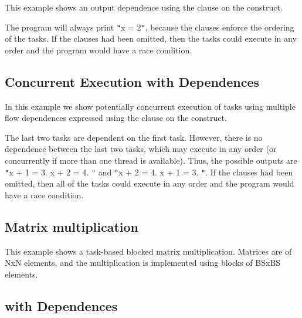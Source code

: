 This example shows an output dependence using the  
clause on the  construct.



The program will always print \texttt{"}x = 2\texttt{"}, because the  
clauses enforce the ordering of the tasks. If the  clauses had been 
omitted, then the tasks could execute in any order and the program would have a 
race condition.

\pagebreak
\subsection{Concurrent Execution with Dependences}
\label{subsec:task_concurrent_depend}

In this example we show potentially concurrent execution of tasks using multiple 
flow dependences expressed using the  clause on the  
construct.



The last two tasks are dependent on the first task. However, there is no dependence 
between the last two tasks, which may execute in any order (or concurrently if 
more than one thread is available). Thus, the possible outputs are \texttt{"}x 
+ 1 = 3. x + 2 = 4. \texttt{"} and \texttt{"}x + 2 = 4. x + 1 = 3. \texttt{"}. 
If the  clauses had been omitted, then all of the tasks could execute 
in any order and the program would have a race condition.

\subsection{Matrix multiplication}
\label{subsec:task_matrix_mult}

This example shows a task-based blocked matrix multiplication. Matrices are of 
NxN elements, and the multiplication is implemented using blocks of BSxBS elements.



\subsection{ with Dependences}
\label{subsec:taskwait_depend}

